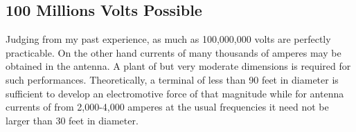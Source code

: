 \documentclass[a4paper,12pt,english,twoside,openright]{memoir}
\begin{document}
\begin{figure}[p]
	\vspace*{-2cm}
\end{figure}

\subsection{100 Millions Volts Possible}
Judging from my past experience, as much as 100,000,000 volts are perfectly practicable.  On 
the other hand currents of many thousands of amperes may be obtained in the antenna.  A plant 
of but very moderate dimensions is required for such performances.  Theoretically, a terminal of 
less than 90 feet in diameter is sufficient to develop an electromotive force of that magnitude 
while for antenna currents of from 2,000-4,000 amperes at the usual frequencies it need not be 
larger than 30 feet in diameter.  
\end{document}
